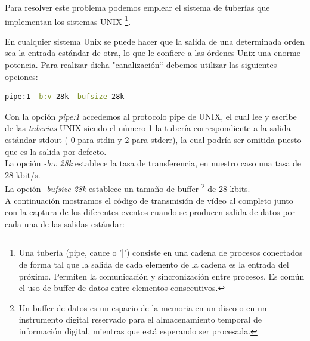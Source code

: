 Para resolver este problema podemos emplear el sistema de tuberías que implementan los sistemas UNIX \footnote{ Una tubería (pipe, cauce o '|') consiste en una cadena de 
procesos conectados de forma tal que la salida de cada elemento de la cadena es la entrada del próximo. Permiten la comunicación y sincronización entre procesos. Es común el uso de
buffer de datos entre elementos consecutivos. }.

En cualquier sistema Unix se puede hacer que la salida de una determinada orden sea la entrada estándar de otra, lo que le confiere a las órdenes Unix una enorme potencia.
Para realizar dicha "canalización`` debemos utilizar las siguientes opciones:\\

\begin{lstlisting}[language=bash]
  pipe:1 -b:v 28k -bufsize 28k
\end{lstlisting}


Con la opción \emph{pipe:1} accedemos al protocolo pipe de UNIX, el cual lee y escribe de las \emph{tuberias} UNIX siendo el número 1 la tubería correspondiente a la salida estándar 
stdout ( 0 para stdin y 2 para stderr), la cual podría ser omitida puesto que es la salida por defecto.\\

La opción \emph{-b:v 28k} establece la tasa de transferencia, en nuestro caso una tasa de 28 kbit/s.\\

La opción \emph{-bufsize 28k} establece un tamaño de buffer \footnote{Un buffer de datos es un espacio de la memoria en un disco o en un instrumento digital reservado para el almacenamiento
temporal de información digital, mientras que está esperando ser procesada.} de 28 kbits.\\

A continuación mostramos el código de transmisión de vídeo al completo junto con la captura de los diferentes eventos cuando se producen salida de datos por cada una de las salidas estándar:\\

